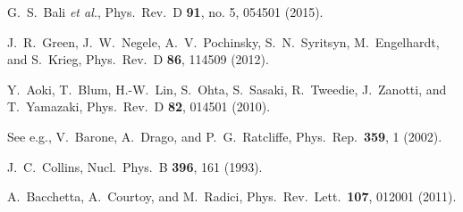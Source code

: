 \documentclass[aps,prd,twocolumn,groupedaddress,showpacs,superscriptaddress,floatfix,nofootinbib,10pt]{revtex4-1}
\begin{document}
\begin{thebibliography}{}
  G.~S.~Bali {\it et al.},
  Phys.\ Rev.\ D {\bf 91}, no. 5, 054501 (2015).


  J.~R.~Green, J.~W.~Negele, A.~V.~Pochinsky, S.~N.~Syritsyn, M.~Engelhardt, and S.~Krieg,
  Phys.\ Rev.\ D {\bf 86}, 114509 (2012).


  Y.~Aoki, T.~Blum, H.-W.~Lin, S.~Ohta, S.~Sasaki, R.~Tweedie, J.~Zanotti, and T.~Yamazaki,
  Phys.\ Rev.\ D {\bf 82}, 014501 (2010).


  See e.g., V.~Barone, A.~Drago, and P.~G.~Ratcliffe,
  Phys.\ Rep.\  {\bf 359}, 1 (2002).


  J.~C.~Collins,
  Nucl.\ Phys.\ B {\bf 396}, 161 (1993).


  A.~Bacchetta, A.~Courtoy, and M.~Radici,
  Phys.\ Rev.\ Lett.\  {\bf 107}, 012001 (2011).



\end{thebibliography}
\end{document}
